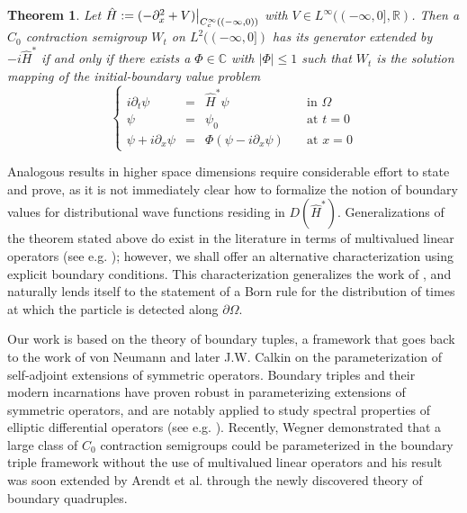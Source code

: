 \documentclass{article}
\numberwithin{equation}{section}
\newtheorem*{theorem*}{Theorem}
\begin{document}
\begin{theorem*}
    Let $\hat{H}:=(-\partial_x^2 + V)\big{|}_{C_c^\infty((-\infty,0))}$ with $V \in L^\infty((-\infty,0],\mathbb{R})$. Then a $C_0$ contraction semigroup $W_t$ on $L^2((-\infty,0])$ has its generator extended by $-i\hat{H}^*$ if and only if there exists a $\Phi \in \mathbb{C}$ with $|\Phi|\leq 1$ such that $W_t$ is the solution mapping of the initial-boundary value problem \em
    \begin{equation}
        \left\{\begin{array}{rclr}
       i \partial_t \psi&=& \hat{H}^* \psi \quad &\text{in } \Omega
       \\
       \psi &=&\psi_0 \quad &\text{at } t=0
       \\
        \psi+i\partial_x\psi&=&\Phi(\psi-i\partial_x \psi) \quad &\text{at } x=0
    \end{array}
    \right.
    \end{equation}
\end{theorem*}
Analogous results in higher space dimensions require considerable effort to state and prove, as it is not immediately clear how to formalize the notion of boundary values for distributional wave functions residing in $D(\hat{H}^*)$. Generalizations of the theorem stated above do exist in the literature in terms of multivalued linear operators (see e.g. \cite{Derkach,BHS2020}); however, we shall offer an alternative characterization using explicit boundary conditions. This characterization generalizes the work of \cite{Facchi}, and naturally lends itself to the statement of a Born rule for the distribution of times at which the particle is detected along $\partial \Omega$.
\par
Our work is based on the theory of boundary tuples, a framework that goes back to the work of von Neumann \cite{NeumannOne,NeumannTwo} and later J.W. Calkin \cite{Calkin} on the parameterization of self-adjoint extensions of symmetric operators. Boundary triples and their modern incarnations have proven robust in parameterizing extensions of symmetric operators, and are notably applied to study spectral properties of elliptic differential operators (see e.g. \cite{BEHRNDTLanger2007,BEHRNDT2014}). Recently, Wegner \cite{Wegner2017}
demonstrated that a large class of $C_0$ contraction semigroups could be parameterized in the boundary triple framework without the use of multivalued linear operators and his result was soon extended by Arendt et al. \cite{Arendt2023} through the newly discovered theory of boundary quadruples.
\end{document}
